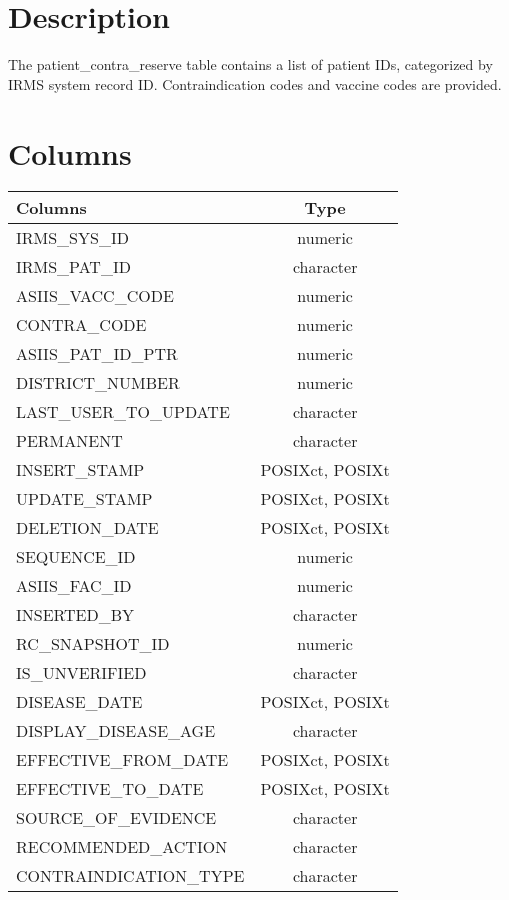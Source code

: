 \documentclass[
  letterpaper,
  DIV=11,
  numbers=noendperiod]{scrreprt}
\begin{document}
\hypertarget{description-25}{%
\section*{Description}\label{description-25}}

The patient\_contra\_reserve table contains a list of patient IDs,
categorized by IRMS system record ID. Contraindication codes and vaccine
codes are provided.

\hypertarget{columns-25}{%
\section*{Columns}\label{columns-25}}

\begin{longtable}{lc}
\toprule
Columns & Type \\ 
\midrule
IRMS\_SYS\_ID & numeric \\ 
IRMS\_PAT\_ID & character \\ 
ASIIS\_VACC\_CODE & numeric \\ 
CONTRA\_CODE & numeric \\ 
ASIIS\_PAT\_ID\_PTR & numeric \\ 
DISTRICT\_NUMBER & numeric \\ 
LAST\_USER\_TO\_UPDATE & character \\ 
PERMANENT & character \\ 
INSERT\_STAMP & POSIXct, POSIXt \\ 
UPDATE\_STAMP & POSIXct, POSIXt \\ 
DELETION\_DATE & POSIXct, POSIXt \\ 
SEQUENCE\_ID & numeric \\ 
ASIIS\_FAC\_ID & numeric \\ 
INSERTED\_BY & character \\ 
RC\_SNAPSHOT\_ID & numeric \\ 
IS\_UNVERIFIED & character \\ 
DISEASE\_DATE & POSIXct, POSIXt \\ 
DISPLAY\_DISEASE\_AGE & character \\ 
EFFECTIVE\_FROM\_DATE & POSIXct, POSIXt \\ 
EFFECTIVE\_TO\_DATE & POSIXct, POSIXt \\ 
SOURCE\_OF\_EVIDENCE & character \\ 
RECOMMENDED\_ACTION & character \\ 
CONTRAINDICATION\_TYPE & character \\ 

\end{longtable}
\end{document}
